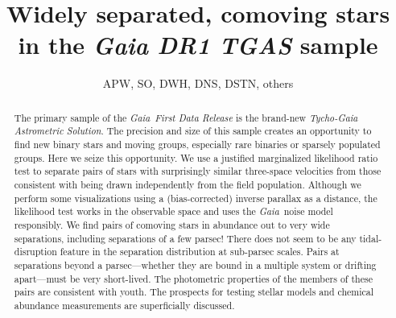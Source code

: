\documentclass[manuscript, letterpaper]{aastex6}
\newcommand{\project}[1]{\textsl{#1}}
\newcommand{\gaia}{\project{Gaia}}
\begin{document}
\sloppy\sloppypar\raggedbottom\frenchspacing %

\title{Widely separated, comoving stars in the \textsl{Gaia DR1 TGAS} sample}
\author{APW, SO, DWH, DNS, DSTN, others}



\begin{abstract}
The primary sample of the \gaia\ \textsl{First Data Release} is the brand-new
\textsl{Tycho-Gaia Astrometric Solution}. The precision and size of this sample
creates an opportunity to find new binary stars and moving groups, especially
rare binaries or sparsely populated groups.
Here we seize this opportunity.
We use a justified marginalized likelihood ratio test to separate
pairs of stars with surprisingly similar three-space velocities from
those consistent with being drawn independently from the field
population.  Although we perform some visualizations using a
(bias-corrected) inverse parallax as a distance, the likelihood test
works in the observable space and uses the \gaia\ noise model
responsibly.
We find pairs of comoving stars in abundance out to very wide
separations, including separations of a few parsec! There does not
seem to be any tidal-disruption feature in the separation distribution
at sub-parsec scales. Pairs at separations beyond a
parsec---whether they are bound in a multiple system or drifting
apart---must be very short-lived. The photometric properties of the
members of these pairs are consistent with youth. The prospects for
testing stellar models and chemical abundance measurements are
superficially discussed.
\end{abstract}
\end{document}
